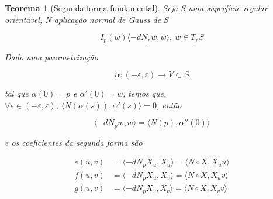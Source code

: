 \documentclass[12pt]{article}
\newtheorem{theorem}{Teorema}
\begin{document}
\begin{theorem}[Segunda forma fundamental]
Seja S uma superfície regular orientável, N aplicação normal de Gauss de S

\begin{equation*}
    I_p(w) \langle - dN_p w, w \rangle,\ w \in T_p S
\end{equation*}

Dado uma parametrização

\begin{equation*}
    \alpha: (- \varepsilon, \varepsilon) \to V \subset S
\end{equation*}

tal que $\alpha(0) = p$ e $\alpha'(0) = w$, temos que, $\forall s \in (- \varepsilon, \varepsilon),\ \langle N(\alpha(s)), \alpha'(s) \rangle = 0$, então

\begin{equation*}
    \langle -d N_p w, w \rangle = \langle N(p), \alpha''(0) \rangle
\end{equation*}

e os coeficientes da segunda forma são

\begin{align*}
    e(u, v) &= \langle - dN_p X_u, X_u \rangle = \langle N \circ X, X_uu \rangle \\
    f(u, v) &= \langle - dN_p X_u, X_v \rangle = \langle N \circ X, X_uv \rangle \\
    g(u, v) &= \langle - dN_p X_v, X_v \rangle = \langle N \circ X, X_vv \rangle
\end{align*}
\end{theorem}
\end{document}
